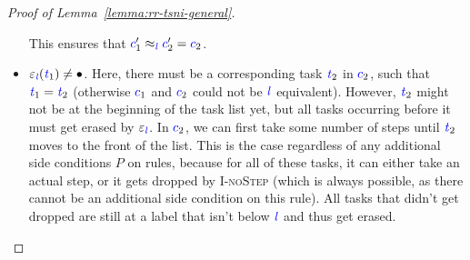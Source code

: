 \documentclass{sigplanconf}
\newcommand{\Varid}[1]{\mathit{#1}}
\newcommand{\alphacondition}[1]{{\color{green}Condition for $\alpha$: #1}}
\begin{document}
\begin{proof}[Proof of Lemma~\ref{lemma:rr-tsni-general}]
\begin{itemize}
\begin{description}
    \end{description}
    This ensures that $\ensuremath{\ifc{c}_{1}'}\approx_{\ensuremath{\ifc{\Varid{l}}}}\ensuremath{\ifc{c}_{2}'}=\ensuremath{\ifc{c}_{2}}$.
    \item $\ensuremath{\varepsilon_{\ifc{\Varid{l}}}(\ifc{\Varid{t}}_{1})}\neq\ensuremath{\bullet}$.
    Here, there must be a corresponding
    task \ensuremath{\ifc{\Varid{t}}_{2}} in \ensuremath{\ifc{c}_{2}},
    such that \ensuremath{\ifc{\Varid{t}}_{1}\mathrel{=}\ifc{\Varid{t}}_{2}} (otherwise \ensuremath{\ifc{c}_{1}} and
    \ensuremath{\ifc{c}_{2}} could not be \ensuremath{\ifc{\Varid{l}}} equivalent).
    However, \ensuremath{\ifc{\Varid{t}}_{2}} might not be at the beginning of the task list yet, but
    all tasks occurring before it must get erased by \ensuremath{\varepsilon_{\ifc{\Varid{l}}}}.
    In \ensuremath{\ifc{c}_{2}}, we can first take some number of steps until \ensuremath{\ifc{\Varid{t}}_{2}} moves
    to the front of the list.
    This is the case regardless of any additional side conditions $P$ on
    rules, because for all of these tasks, it can either take an actual
    step, or it gets dropped by \textsc{I-noStep} (which is always
    possible, as there cannot be an additional side condition on this
    rule).  All tasks that didn't get dropped are still at a label
    that isn't below \ensuremath{\ifc{\Varid{l}}} and thus get erased.
    
    

\end{itemize}
\end{proof}
\end{document}
